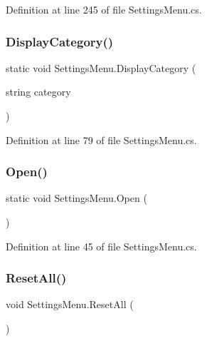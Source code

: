 Definition at line 245 of file Settings\+Menu.\+cs.

\mbox{\label{class_settings_menu_a9699b74ea6b8a8be066044d0b34f4ab0}} 
\subsubsection{\texorpdfstring{Display\+Category()}{DisplayCategory()}}
{\footnotesize\ttfamily static void Settings\+Menu.\+Display\+Category (\begin{DoxyParamCaption}\item[{string}]{category }\end{DoxyParamCaption})\hspace{0.3cm}{\ttfamily [static]}}



Definition at line 79 of file Settings\+Menu.\+cs.

\mbox{\label{class_settings_menu_adce810e9892af509032afe3abd35c69a}} 
\subsubsection{\texorpdfstring{Open()}{Open()}}
{\footnotesize\ttfamily static void Settings\+Menu.\+Open (\begin{DoxyParamCaption}{ }\end{DoxyParamCaption})\hspace{0.3cm}{\ttfamily [static]}}



Definition at line 45 of file Settings\+Menu.\+cs.

\mbox{\label{class_settings_menu_a40e5c0326770a9ba25d011a2414ae4e1}} 
\subsubsection{\texorpdfstring{Reset\+All()}{ResetAll()}}
{\footnotesize\ttfamily void Settings\+Menu.\+Reset\+All (\begin{DoxyParamCaption}{ }\end{DoxyParamCaption})}



